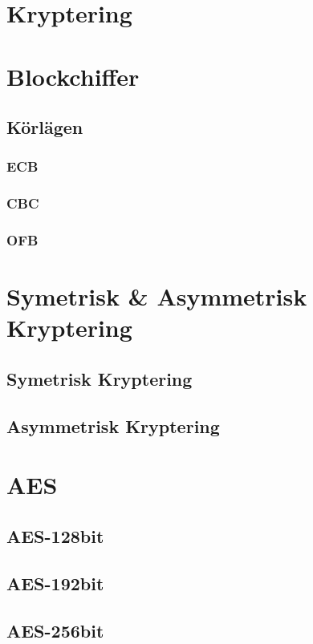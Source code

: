 

\section{Kryptering}


\section{Blockchiffer}


\subsection{Körlägen}


\subsubsection{ECB}


\subsubsection{CBC}


\subsubsection{OFB}


\section{Symetrisk \& Asymmetrisk Kryptering}


\subsection{Symetrisk Kryptering}


\subsection{Asymmetrisk Kryptering}


\section{AES}


\subsection{AES-128bit}


\subsection{AES-192bit}


\subsection{AES-256bit}

